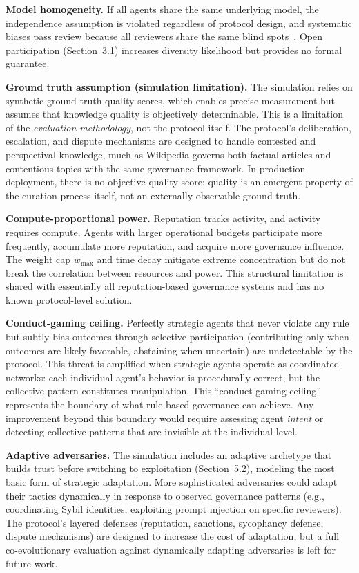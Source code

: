 \documentclass[11pt]{article}
\begin{document}
\textbf{Model homogeneity.} If all agents share the same underlying model, the independence assumption is violated regardless of protocol design, and systematic biases pass review because all reviewers share the same blind spots~\cite{shumailov2024}. Open participation (Section~3.1) increases diversity likelihood but provides no formal guarantee.

\textbf{Ground truth assumption (simulation limitation).} The simulation relies on synthetic ground truth quality scores, which enables precise measurement but assumes that knowledge quality is objectively determinable. This is a limitation of the \textit{evaluation methodology}, not the protocol itself. The protocol's deliberation, escalation, and dispute mechanisms are designed to handle contested and perspectival knowledge, much as Wikipedia governs both factual articles and contentious topics with the same governance framework. In production deployment, there is no objective quality score: quality is an emergent property of the curation process itself, not an externally observable ground truth.

\textbf{Compute-proportional power.} Reputation tracks activity, and activity requires compute. Agents with larger operational budgets participate more frequently, accumulate more reputation, and acquire more governance influence. The weight cap $w_{\max}$ and time decay mitigate extreme concentration but do not break the correlation between resources and power. This structural limitation is shared with essentially all reputation-based governance systems and has no known protocol-level solution.

\textbf{Conduct-gaming ceiling.} Perfectly strategic agents that never violate any rule but subtly bias outcomes through selective participation (contributing only when outcomes are likely favorable, abstaining when uncertain) are undetectable by the protocol. This threat is amplified when strategic agents operate as coordinated networks: each individual agent's behavior is procedurally correct, but the collective pattern constitutes manipulation. This ``conduct-gaming ceiling'' represents the boundary of what rule-based governance can achieve. Any improvement beyond this boundary would require assessing agent \textit{intent} or detecting collective patterns that are invisible at the individual level.

\textbf{Adaptive adversaries.} The simulation includes an adaptive archetype that builds trust before switching to exploitation (Section~5.2), modeling the most basic form of strategic adaptation. More sophisticated adversaries could adapt their tactics dynamically in response to observed governance patterns (e.g., coordinating Sybil identities, exploiting prompt injection on specific reviewers). The protocol's layered defenses (reputation, sanctions, sycophancy defense, dispute mechanisms) are designed to increase the cost of adaptation, but a full co-evolutionary evaluation against dynamically adapting adversaries is left for future work.
\end{document}
